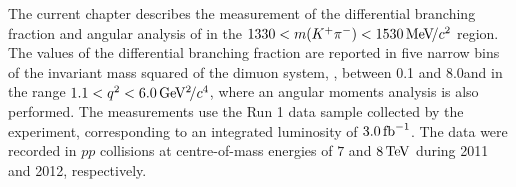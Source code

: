 The current chapter describes the measurement of the differential branching fraction and angular analysis of \BdToKpimm in the $1330<m({{K}^+}{{\pi}^-})<1530{\mathrm{\,Me\kern -0.1em V\!/}c^2}$ region. The values of the differential branching fraction are reported in five narrow bins of the invariant mass squared of the dimuon system, \qsq, between 0.1 and 8.0\gevgevcccc and in the range $1.1<{q^2}<6.0{\mathrm{\,Ge\kern -0.1em V^2\!/}c^4}$,  where an angular moments analysis is also performed. The measurements use the Run 1 data sample collected by the \lhcb experiment, corresponding to an integrated luminosity of $3.0\mbox{\,fb}^{-1}$. The data were recorded in $pp$ collisions at centre-of-mass energies of $7$ and $8\mathrm{\,Te\kern -0.1em V}$ during 2011 and 2012, respectively. 





 
